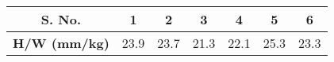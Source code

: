 \begin{center}
\begin{tabular}{|c|c|c|c|c|c|c|}
\hline
\textbf{S. No.} & 1 & 2 & 3 & 4 & 5 & 6 \\
\hline
\textbf{H/W (mm/kg)} & 23.9 & 23.7 & 21.3 & 22.1 & 25.3 & 23.3 \\
\hline
\end{tabular}
\end{center}
